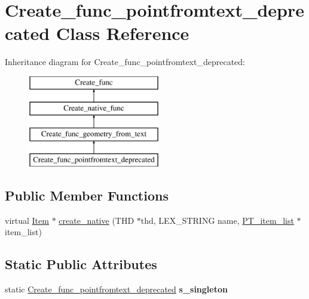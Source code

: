\hypertarget{classCreate__func__pointfromtext__deprecated}{}\section{Create\+\_\+func\+\_\+pointfromtext\+\_\+deprecated Class Reference}
\label{classCreate__func__pointfromtext__deprecated}
Inheritance diagram for Create\+\_\+func\+\_\+pointfromtext\+\_\+deprecated\+:\begin{figure}[H]
\begin{center}
\leavevmode
\includegraphics[height=4.000000cm]{classCreate__func__pointfromtext__deprecated}
\end{center}
\end{figure}
\subsection*{Public Member Functions}
\begin{DoxyCompactItemize}
\item 
virtual \mbox{\hyperlink{classItem}{Item}} $\ast$ \mbox{\hyperlink{classCreate__func__pointfromtext__deprecated_a15b37997c76797c4da46be0fd82afae1}{create\+\_\+native}} (T\+HD $\ast$thd, L\+E\+X\+\_\+\+S\+T\+R\+I\+NG name, \mbox{\hyperlink{classPT__item__list}{P\+T\+\_\+item\+\_\+list}} $\ast$item\+\_\+list)
\end{DoxyCompactItemize}
\subsection*{Static Public Attributes}
\begin{DoxyCompactItemize}
\item 
\mbox{\label{classCreate__func__pointfromtext__deprecated_a6efd13319bfa399aeb19834895f040d4}} 
static \mbox{\hyperlink{classCreate__func__pointfromtext__deprecated}{Create\+\_\+func\+\_\+pointfromtext\+\_\+deprecated}} {\bfseries s\+\_\+singleton}
\end{DoxyCompactItemize}
